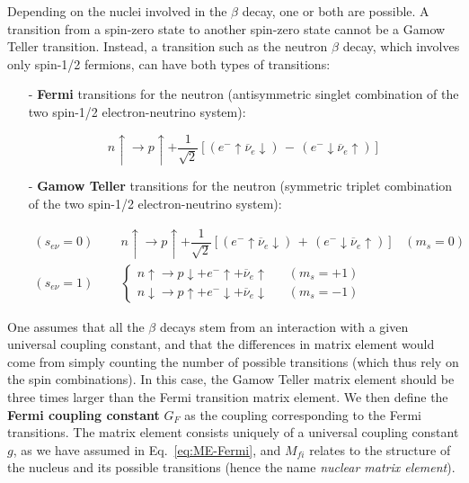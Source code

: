 Depending on the nuclei involved in the $\beta$ decay, one or both are possible. A transition from a spin-zero state to another spin-zero state cannot be a Gamow Teller transition. Instead, a transition such as the neutron $\beta$ decay, which involves only spin-1/2 fermions, can have both types of transitions:
\begin{itemize}
    \item[-] {\bf Fermi} transitions for the neutron (antisymmetric singlet combination of the two spin-1/2 electron-neutrino system):
    
    $$ n\uparrow \rightarrow p\uparrow + \dfrac{1}{\sqrt{2}} \left [ (e^-\uparrow  \overline{\nu}_e \downarrow)  \, - \, (e^-\downarrow  \overline{\nu}_e \uparrow)  \right ] $$
    
        \item[-] {\bf Gamow Teller} transitions for the neutron (symmetric triplet combination of the two spin-1/2 electron-neutrino system):

  \begin{eqnarray}
  (s_{e\nu} = 0) & \; \; & n\uparrow \rightarrow  p\uparrow + \dfrac{1}{\sqrt{2}} \left [ (e^-\uparrow  \overline{\nu}_e \downarrow)  \, + \, (e^-\downarrow  \overline{\nu}_e \uparrow)  \right ] \; \; \; (m_s=0)\nonumber \\
    (s_{e\nu} = 1) & \; \; & \left \{ \begin{array}{cl}
    n\uparrow  \rightarrow  p\downarrow + e^-\uparrow  + \overline{\nu}_e \uparrow & \; \; \; (m_s =+1)  \\
    n\downarrow  \rightarrow  p\uparrow + e^-\downarrow  + \overline{\nu}_e \downarrow  & \; \; \; (m_s =-1) 
    \end{array} \right . \nonumber
  \end{eqnarray}  

\end{itemize}

One assumes that all the $\beta$ decays stem from an interaction with a given universal coupling constant, and that the differences in matrix element would come from simply counting the number of possible transitions (which thus rely on the spin combinations). In this case, the Gamow Teller matrix element should be three times larger than the Fermi transition matrix element. We then define the {\bf Fermi coupling constant} $G_F$ as the coupling corresponding to the Fermi transitions. The matrix element consists uniquely of a universal coupling constant $g$, as we have assumed in Eq.~\eqref{eq:ME-Fermi}, and $M_{fi}$ relates to the structure of the nucleus and its possible transitions (hence the name \emph{nuclear matrix element}).

